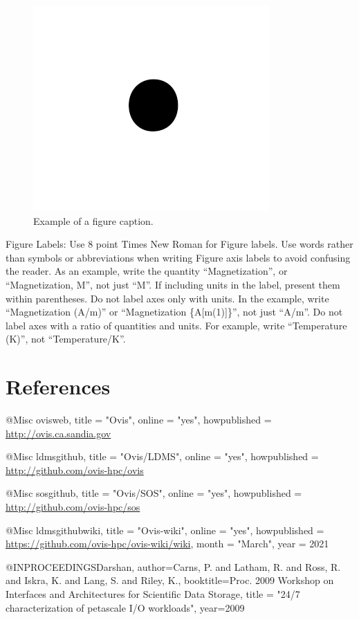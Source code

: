 \documentclass[conference]{IEEEtran}
\begin{document}
\begin{figure}[htbp]
\centerline{\includegraphics{fig1.png}}
\caption{Example of a figure caption.}
\label{fig}
\end{figure}

Figure Labels: Use 8 point Times New Roman for Figure labels. Use words 
rather than symbols or abbreviations when writing Figure axis labels to 
avoid confusing the reader. As an example, write the quantity 
``Magnetization'', or ``Magnetization, M'', not just ``M''. If including 
units in the label, present them within parentheses. Do not label axes only 
with units. In the example, write ``Magnetization (A/m)'' or ``Magnetization 
\{A[m(1)]\}'', not just ``A/m''. Do not label axes with a ratio of 
quantities and units. For example, write ``Temperature (K)'', not 
``Temperature/K''.

\section*{References}




@Misc{		  ovisweb,
  title		= "{O}vis",
  online	= "yes",
  howpublished	= {\url{http://ovis.ca.sandia.gov}}
}

@Misc{		  ldmsgithub,
  title		= "{O}vis/{LDMS}",
  online	= "yes",
  howpublished	= {\url{http://github.com/ovis-hpc/ovis}}
}

@Misc{		  sosgithub,
  title		= "{O}vis/{SOS}",
  online	= "yes",
  howpublished	= {\url{http://github.com/ovis-hpc/sos}}
}

@Misc{		  ldmsgithubwiki,
  title		= "{O}vis-wiki",
  online	= "yes",
  howpublished	= {\url{https://github.com/ovis-hpc/ovis-wiki/wiki}},
  month = "March",
  year = 2021
}

@INPROCEEDINGS{Darshan,
author={Carns, P. and Latham, R. and Ross, R. and Iskra, K. and Lang, S. and Riley, K.},
booktitle={Proc. 2009 Workshop on Interfaces and Architectures for Scientific Data Storage},
title = "{24/7} characterization of petascale {I/O} workloads",
year={2009}
}
\end{document}
